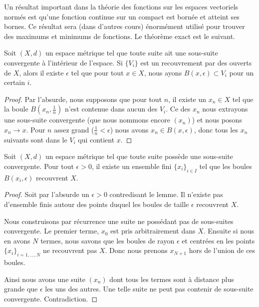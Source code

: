 Un résultat important dans la théorie des fonctions sur les espaces vectoriels normés est qu'une fonction continue sur un compact est bornée et atteint ses bornes. Ce résultat sera (dans d'autres cours) énormément utilisé pour trouver des maximums et minimums de fonctions. Le théorème exact est le suivant.

\begin{lemma}    \label{LemQFXOWyx}
    Soit \( (X,d)\) un espace métrique tel que toute suite ait une sous-suite convergente à l'intérieur de l'espace. Si \( \{ V_i \}\) est un recouvrement par des ouverts de \( X\), alors il existe \( \epsilon\) tel que pour tout \( x\in X\), nous ayons \( B(x,\epsilon)\subset V_i\) pour un certain \( i\).
\end{lemma}

\begin{proof}
    Par l'absurde, nous supposons que pour tout \( n\), il existe un \( x_n\in X\) tel que la boule \( B(x_n,\frac{1}{ n })\) n'est contenue dans aucun des \( V_i\). Ce des \( x_n\) nous extrayons une sous-suite convergente (que nous nommons encore \( (x_n)\)) et nous posons \( x_n\to x\). Pour \( n\) assez grand (\( \frac{1}{ n }<\epsilon\)) nous avons \( x_n\in B(x,\epsilon)\), donc tous les \( x_n\) suivants sont dans le \( V_i\) qui contient \( x\).
\end{proof}

\begin{lemma}   \label{LemMGQqgDG}
    Soit \( (X,d)\) un espace métrique tel que toute suite possède une sous-suite convergente. Pour tout \( \epsilon>0\), il existe un ensemble fini \( \{ x_i \}_{i\in I}\) tel que les boules \( B(x_i,\epsilon)\) recouvrent \( X\).
\end{lemma}

\begin{proof}
    Soit par l'absurde un \( \epsilon>0\) contredisant le lemme. Il n'existe pas d'ensemble finis autour des points duquel les boules de taille \( \epsilon\) recouvrent \( X\).

    Nous construisons par récurrence une suite ne possédant pas de sous-suites convergente. Le premier terme, \( x_0\) est pris arbitrairement dans \( X\). Ensuite si nous en avons \( N\) termes, nous savons que les boules de rayon \( \epsilon\) et centrées en les points \( \{ x_i \}_{i=1,\ldots, N}\) ne recouvrent pas \( X\). Donc nous prenons \( x_{N+1}\) hors de l'union de ces boules.

    Ainsi nous avons une suite \( (x_n)\) dont tous les termes sont à distance plus grande que \( \epsilon\) les uns des autres. Une telle suite ne peut pas contenir de sous-suite convergente. Contradiction.
\end{proof}


